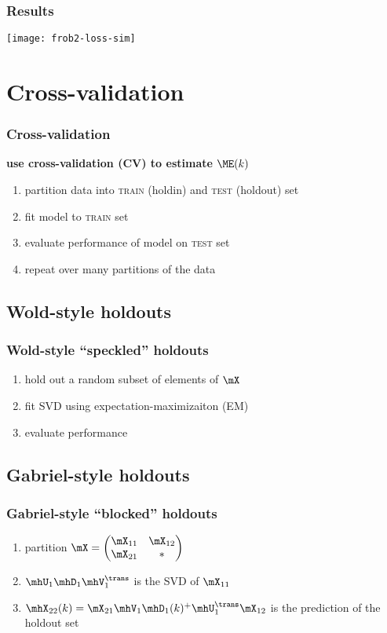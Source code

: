 \documentclass{beamer}
\begin{document}
\begin{frame}
  \frametitle{Results}
  \begin{center}
  \texttt{[image: frob2-loss-sim]}
  \end{center}
\end{frame}


\section{Cross-validation}

\begin{frame}
  \frametitle{Cross-validation}
  \textbf{use cross-validation (CV) to estimate $\ME(k)$}
  \begin{enumerate}
  \item partition data into \textsc{train} (holdin) and \textsc{test} (holdout) set
  \item fit model to \textsc{train} set   
  \item evaluate performance of model on \textsc{test} set
  \item repeat over many partitions of the data
  \end{enumerate}
\end{frame}

\subsection{Wold-style holdouts}

\begin{frame}
  \frametitle{Wold-style ``speckled'' holdouts}
  \begin{enumerate}
    \item hold out a random subset of elements of $\mX$
    \item fit SVD using expectation-maximizaiton (EM)
    \item evaluate performance
  \end{enumerate}
\end{frame}

\subsection{Gabriel-style holdouts}

\begin{frame}
  \frametitle{Gabriel-style ``blocked'' holdouts}
  \begin{enumerate}
    \item partition
    \(
      \mX = \left(\begin{matrix} \mX_{11} & \mX_{12} \\ \mX_{21} & \ast \end{matrix}\right)
    \)
    \item $\mhU_1 \mhD_1 \mhV_1^\trans$ is the SVD of $\mX_{11}$
    \item $\mhX_{22}(k) = \mX_{21} \mhV_1 \mhD_1(k)^+ \mhU_1^\trans \mX_{12}$ is the prediction of the holdout set
  \end{enumerate}
\end{frame}
\end{document}
